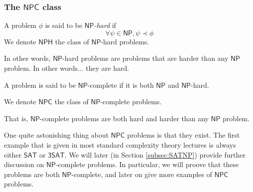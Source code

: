 \subsubsection{The $ \mathsf{NPC} $ class}

\begin{definition}
    A problem $ \phi $ is said to be \textit{$ \mathsf{NP} $-hard} if
    \[
        \forall \psi \in \mathsf{NP}, \psi \prec \phi
    \]
    We denote $ \mathsf{NPH} $ the class of $ \mathsf{NP} $-hard problems.
\end{definition}

In other words, $ \mathsf{NP} $-hard problems are problems that are harder than any $ \mathsf{NP} $ problem. In other words... they are hard.

\begin{definition}
    A problem is said to be $ \mathsf{NP} $-complete if it is both $ \mathsf{NP} $ and $ \mathsf{NP} $-hard.

    We denote $ \mathsf{NPC} $ the class of $ \mathsf{NP} $-complete problems.
\end{definition}

That is, $ \mathsf{NP} $-complete problems are both hard and harder than any $ \mathsf{NP} $ problem. 

One quite astonishing thing about $ \mathsf{NPC} $ problems is that they exist. The first example that is given in most standard complexity theory lectures is always either $ \mathsf{SAT} $ or $ \mathsf{3SAT} $. We will later (in Section \ref{subsec:SATNP}) provide further discussion on $ \mathsf{NP} $-complete problems. In particular, we will proove that these problems are both $ \mathsf{NP} $-complete, and later on give more examples of $ \mathsf{NPC} $ problems.

